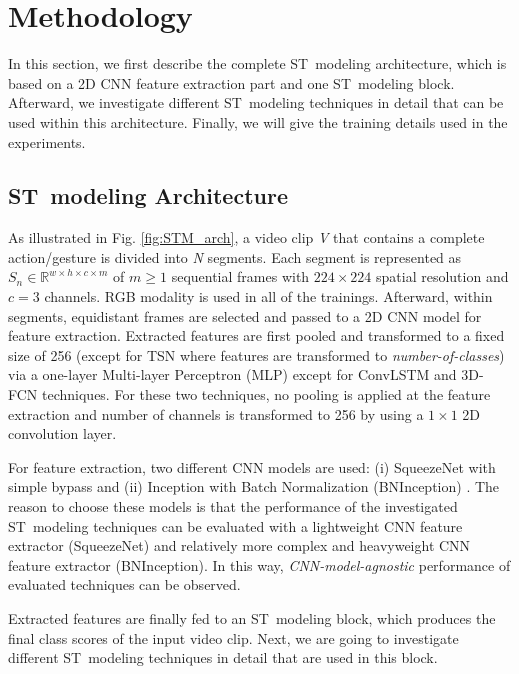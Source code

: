 \documentclass[runningheads]{llncs}
\begin{document}
 \vspace{-0.25cm}
\section{Methodology}

In this section, we first describe the complete ST~modeling architecture, which is based on a 2D CNN feature extraction part and one ST~modeling block. Afterward, we investigate different ST~modeling techniques in detail that can be used within this architecture. Finally, we will give the training details used in the experiments.

\subsection{ST~modeling Architecture}

As illustrated in Fig. \ref{fig:STM_arch}, a video clip \textit{V} that contains a complete action/gesture is divided into \textit{N} segments. Each segment is represented as $S_n \in \mathbb{R}^{w \times h \times c \times m}$ of $m \geq 1$ sequential frames with $224 \times 224$ spatial resolution and $c=3$ channels. RGB modality is used in all of the trainings. Afterward, within segments, equidistant frames are selected and passed to a 2D CNN model for feature extraction. Extracted features are first pooled and transformed to a fixed size of 256 (except for TSN where features are transformed to \textit{number-of-classes}) via a one-layer Multi-layer Perceptron (MLP) except for ConvLSTM and 3D-FCN techniques. For these two techniques, no pooling is applied at the feature extraction and number of channels is transformed to 256 by using a $1\times1$ 2D convolution layer.

For feature extraction, two different CNN models are used: (i) SqueezeNet \cite{iandola2016squeezenet} with simple bypass and (ii) Inception with Batch Normalization (BNInception) \cite{ioffe2015batch}. The reason to choose these models is that the performance of the investigated ST~modeling techniques can be evaluated with a lightweight CNN feature extractor (SqueezeNet) and relatively more complex and heavyweight CNN feature extractor (BNInception). In this way, \textit{CNN-model-agnostic} performance of evaluated techniques can be observed.  

Extracted features are finally fed to an ST~modeling block, which produces the final class scores of the input video clip. Next, we are going to investigate different ST~modeling techniques in detail that are used in this block.
\end{document}
